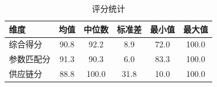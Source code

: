 \begin{table}[hbpt]
\centering
\caption{评分统计}
\label{tab:score_stats}
\footnotesize
\setlength{\tabcolsep}{10pt}      %
\renewcommand{\arraystretch}{0.9} %
\begin{tabular*}{\textwidth}{@{\extracolsep{\fill}}lccccc@{}}
\toprule
\textbf{维度} & \textbf{均值} & \textbf{中位数} & \textbf{标准差} & \textbf{最小值} & \textbf{最大值} \\
\midrule
综合得分   & 90.8 & 92.2 & 8.9  & 72.0 & 100.0 \\
参数匹配分 & 91.3 & 90.3 & 6.0  & 83.3 & 100.0 \\
供应链分   & 88.8 & 100.0 & 31.8 & 10.0 & 100.0 \\
\bottomrule
\end{tabular*}
\end{table}
